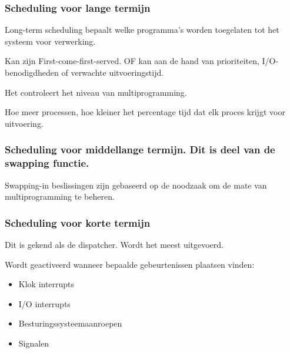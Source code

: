 \subsubsection{Scheduling voor lange termijn}

Long-term scheduling bepaalt welke programma’s worden toegelaten tot het systeem voor verwerking.

Kan zijn First-come-first-served. OF kan aan de hand van prioriteiten, I/O-benodigdheden of verwachte uitvoeringstijd.

Het controleert het niveau van multiprogramming.

Hoe meer processen, hoe kleiner het percentage tijd dat elk proces krijgt voor uitvoering.


\subsubsection{Scheduling voor middellange termijn. Dit is deel van de swapping functie.}

Swapping-in beslissingen zijn gebaseerd op de noodzaak om de mate van multiprogramming te beheren.

\subsubsection{Scheduling voor korte termijn}

Dit is gekend als de dispatcher. Wordt het meest uitgevoerd.

Wordt geactiveerd wanneer bepaalde gebeurtenissen plaatsen vinden:

\begin{itemize}
\item Klok interrupts
\item I/O interrupts
\item Besturingssysteemaanroepen
\item Signalen
\end{itemize}